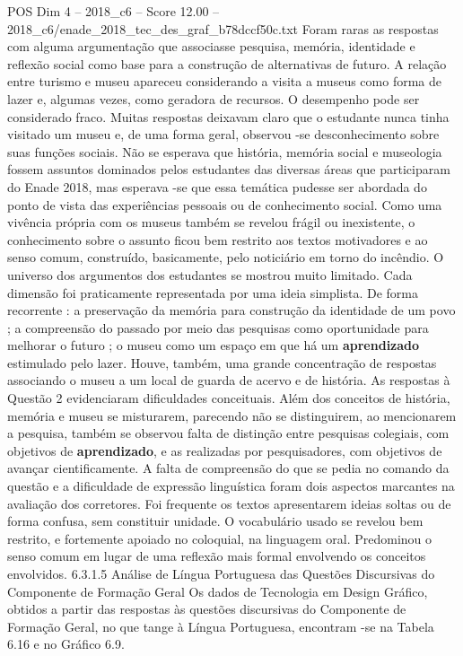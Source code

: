 \begin{textsample}{POS Dim 4 – 2018\_c6 – Score 12.00 – 2018\_c6/enade\_2018\_tec\_des\_graf\_b78dccf50c.txt}
Foram raras as respostas com alguma argumentação que associasse pesquisa, memória, identidade e reflexão social como base para a construção de alternativas de futuro.
A relação entre turismo e museu apareceu considerando a visita a museus como forma de lazer e, algumas vezes, como geradora de recursos.
O desempenho pode ser considerado fraco.
Muitas respostas deixavam claro que o estudante nunca tinha visitado um museu e, de uma forma geral, observou -se desconhecimento sobre suas funções sociais.
Não se esperava que história, memória social e museologia fossem assuntos dominados pelos estudantes das diversas áreas que participaram do Enade 2018, mas esperava -se que essa temática pudesse ser abordada do ponto de vista das experiências pessoais ou de conhecimento social.
Como uma vivência própria com os museus também se revelou frágil ou inexistente, o conhecimento sobre o assunto ficou bem restrito aos textos motivadores e ao senso comum, construído, basicamente, pelo noticiário em torno do incêndio.
O universo dos argumentos dos estudantes se mostrou muito limitado.
Cada dimensão foi praticamente representada por uma ideia simplista.
De forma recorrente : a preservação da memória para construção da identidade de um povo ; a compreensão do passado por meio das pesquisas como oportunidade para melhorar o futuro ; o museu como um espaço em que há um \textbf{aprendizado} estimulado pelo lazer.
Houve, também, uma grande concentração de respostas associando o museu a um local de guarda de acervo e de história.
As respostas à Questão 2 evidenciaram dificuldades conceituais.
Além dos conceitos de história, memória e museu se misturarem, parecendo não se distinguirem, ao mencionarem a pesquisa, também se observou falta de distinção entre pesquisas colegiais, com objetivos de \textbf{aprendizado}, e as realizadas por pesquisadores, com objetivos de avançar cientificamente.
A falta de compreensão do que se pedia no comando da questão e a dificuldade de expressão linguística foram dois aspectos marcantes na avaliação dos corretores.
Foi frequente os textos apresentarem ideias soltas ou de forma confusa, sem constituir unidade.
O vocabulário usado se revelou bem restrito, e fortemente apoiado no coloquial, na linguagem oral.
Predominou o senso comum em lugar de uma reflexão mais formal envolvendo os conceitos envolvidos. 6.3.1.5 Análise de Língua Portuguesa das Questões Discursivas do Componente de Formação Geral Os dados de Tecnologia em Design Gráfico, obtidos a partir das respostas às questões discursivas do Componente de Formação Geral, no que tange à Língua Portuguesa, encontram -se na Tabela 6.16 e no Gráfico 6.9.

\end{textsample}
